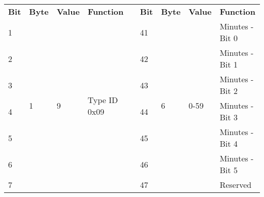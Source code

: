 \documentclass[]{article}
\begin{document}
\begin{table}[ht]
	\centering
	\footnotesize
	\begin{tabular}{lllllllll}
		\cline{1-4} \cline{6-9}
		\textbf{Bit} & \textbf{Byte}      & \textbf{Value}        & \textbf{Function}             & \multirow{9}{*}{} & \textbf{Bit} & \textbf{Byte}       & \textbf{Value}                                                                    & \textbf{Function}         \\ \cline{1-4} \cline{6-9} 
		1            & \multirow{8}{*}{1} & \multirow{8}{*}{9}    & \multirow{8}{*}{Type ID 0x09} &                   & 41           & \multirow{8}{*}{6}  & \multirow{8}{*}{0-59}                                                             & Minutes - Bit 0           \\
		2            &                    &                       &                               &                   & 42           &                     &                                                                                   & Minutes - Bit 1           \\
		3            &                    &                       &                               &                   & 43           &                     &                                                                                   & Minutes - Bit 2           \\
		4            &                    &                       &                               &                   & 44           &                     &                                                                                   & Minutes - Bit 3           \\
		5            &                    &                       &                               &                   & 45           &                     &                                                                                   & Minutes - Bit 4           \\
		6            &                    &                       &                               &                   & 46           &                     &                                                                                   & Minutes - Bit 5           \\
		7            &                    &                       &                               &                   & 47           &                     &                                                                                   & Reserved                  \\

\end{tabular}
\end{table}
\end{document}
